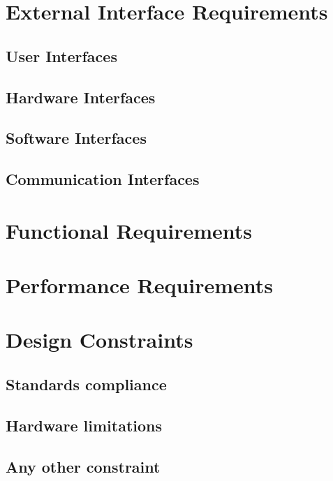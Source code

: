 \section{External Interface Requirements}
\label{sec:External Interface Requirements}%

\subsection{User Interfaces}
\label{sec:user interfaces}%


\subsection{Hardware Interfaces}
\subsection{Software Interfaces}
\subsection{Communication Interfaces}

\section{Functional Requirements}
\label{sec:Functional Requirements}%

\section{Performance Requirements}
\label{sec:Performance Requirements}%

\section{Design Constraints}
\label{sec:Design Constraints}%

\subsection{Standards compliance}
\subsection{Hardware limitations}
\subsection{Any other constraint}

